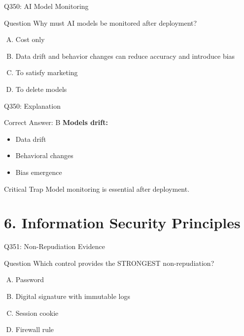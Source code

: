 \documentclass{beamer}
\begin{document}
	\begin{frame}{Q350: AI Model Monitoring}
		\begin{block}{Question}
			Why must AI models be monitored after deployment?
		\end{block}
		\begin{enumerate}[(A)]
			\item Cost only
			\item Data drift and behavior changes can reduce accuracy and introduce bias
			\item To satisfy marketing
			\item To delete models
		\end{enumerate}
	\end{frame}
	
	\begin{frame}{Q350: Explanation}
		\begin{block}{Correct Answer: B}
			\textbf{Models drift:}
			\begin{itemize}
				\item Data drift
				\item Behavioral changes
				\item Bias emergence
			\end{itemize}
		\end{block}
		\begin{alertblock}{Critical Trap}
			Model monitoring is essential after deployment.
		\end{alertblock}
	\end{frame}
	
	\section{6. Information Security Principles}
	
	\begin{frame}{Q351: Non-Repudiation Evidence}
		\begin{block}{Question}
			Which control provides the STRONGEST non-repudiation?
		\end{block}
		\begin{enumerate}[(A)]
			\item Password
			\item Digital signature with immutable logs
			\item Session cookie
			\item Firewall rule
		\end{enumerate}
	\end{frame}
	
\end{document}
